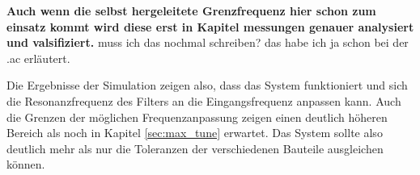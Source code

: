 \documentclass[../main_config.tex]{subfiles}
\begin{document}
\textbf{Auch wenn die selbst hergeleitete Grenzfrequenz hier schon zum einsatz kommt wird diese erst in Kapitel messungen genauer analysiert und valsifiziert.} muss ich das nochmal schreiben? das habe ich ja schon bei der .ac erläutert.\par
\medskip


Die Ergebnisse der Simulation zeigen also, dass das System funktioniert und sich die Resonanzfrequenz des Filters an die Eingangsfrequenz anpassen kann. Auch die Grenzen der möglichen Frequenzanpassung zeigen einen deutlich höheren Bereich als noch in Kapitel \ref{sec:max_tune} erwartet. Das System sollte also deutlich mehr als nur die Toleranzen der verschiedenen Bauteile ausgleichen können. \par
\end{document}
